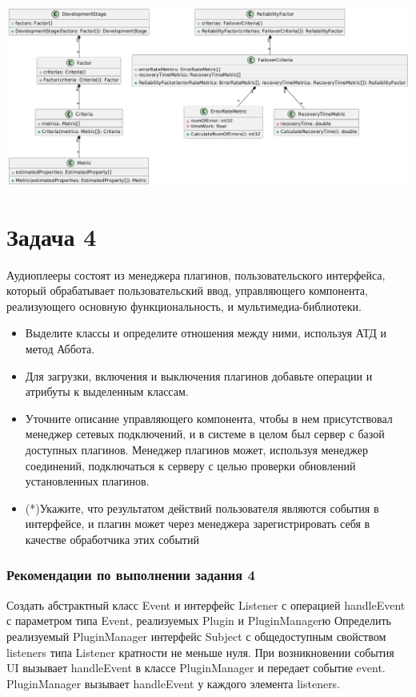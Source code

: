 \documentclass{article}
\begin{document}
\includegraphics[width=\textwidth]{3.png}

\section{Задача 4}
Аудиоплееры состоят из менеджера плагинов, пользовательского интерфейса, который обрабатывает пользовательский ввод, управляющего компонента, реализующего основную функциональность, и мультимедиа-библиотеки.

\begin{itemize}
    \item Выделите классы и определите отношения между ними, используя АТД и метод Аббота.
    \item Для загрузки, включения и выключения плагинов добавьте операции и атрибуты к выделенным классам.
    \item Уточните описание управляющего компонента, чтобы в нем присутствовал менеджер сетевых подключений, и в системе в целом был сервер с базой доступных плагинов. Менеджер плагинов может, используя менеджер соединений, подключаться к серверу с целью проверки обновлений установленных плагинов.
    \item (*)Укажите, что результатом действий пользователя являются события в интерфейсе, и плагин может через менеджера зарегистрировать себя в качестве обработчика этих событий
\end{itemize}

\subsubsection{Рекомендации по выполнении задания 4}
Создать абстрактный класс Event и интерфейс Listener с операцией handleEvent с параметром типа Event, реализуемых Plugin и PluginManagerю Определить реализуемый PluginManager интерфейс Subject с общедоступным свойством listeners типа Listener кратности не меньше нуля. При возникновении события UI вызывает handleEvent в классе PluginManager и передает событие event. PluginManager вызывает handleEvent у каждого элемента listeners.
\end{document}
